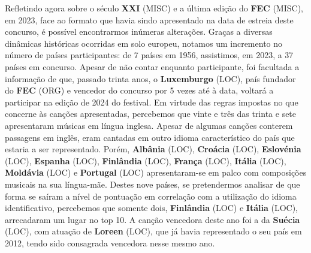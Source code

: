\documentclass[12pt,a4paper]{article}
\begin{document}
Refletindo agora sobre o século \textbf{XXI} (MISC) e a última edição do \textbf{FEC} (MISC), em 2023, face ao formato  que  havia  sindo  apresentado  na  data  de  estreia  deste  concurso,  é  possível encontrarmos inúmeras alterações. Graças a diversas dinâmicas históricas ocorridas em solo europeu, notamos um incremento no número de países participantes: de 7 países em 1956,  assistimos,  em  2023,  a  37  países  em  concurso.  Apesar  de  não  contar  enquanto participante, foi facultada a informação de que, passado trinta anos, o \textbf{Luxemburgo} (LOC), país fundador do \textbf{FEC} (ORG) e vencedor do concurso por 5 vezes até à data, voltará a participar na edição de 2024 do festival. Em virtude das regras impostas no que concerne às canções apresentadas,  percebemos  que  vinte  e  três  das  trinta  e  sete  apresentaram  músicas  em língua inglesa. Apesar de algumas canções conterem passagens em inglês, eram cantadas em outro idioma característico do país  que estaria a ser representado. Porém,  \textbf{Albânia} (LOC), \textbf{Croácia} (LOC),  \textbf{Eslovénia} (LOC),  \textbf{Espanha} (LOC),  \textbf{Finlândia} (LOC),  \textbf{França} (LOC),  \textbf{Itália} (LOC),  \textbf{Moldávia} (LOC)  e  \textbf{Portugal} (LOC) apresentaram-se  em  palco  com  composições  musicais  na  sua  língua-mãe.  Destes  nove países,  se  pretendermos  analisar  de  que  forma  se  saíram  a  nível  de  pontuação  em correlação  com  a  utilização  do  idioma  identificativo,  percebemos  que  somente  dois, \textbf{Finlândia} (LOC) e \textbf{Itália} (LOC), arrecadaram um lugar no top 10. A canção vencedora deste ano foi a da \textbf{Suécia} (LOC), com atuação de \textbf{Loreen} (LOC), que já havia representado o seu país em 2012, tendo sido consagrada vencedora nesse mesmo ano.
\end{document}
